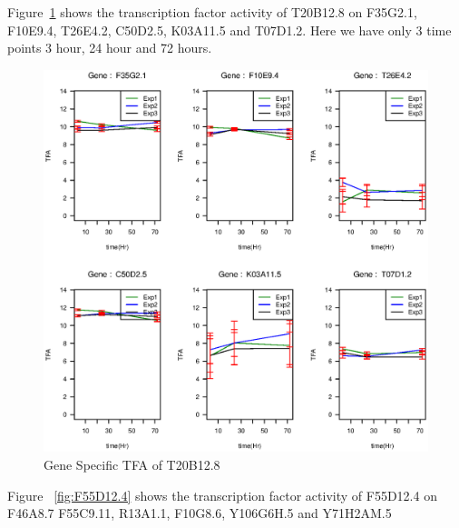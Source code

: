 \documentclass[a4paper,10pt]{report}
\begin{document}
Figure~\ref{fig:T20B12.8} shows the transcription factor activity of T20B12.8 on 
F35G2.1, F10E9.4, T26E4.2, C50D2.5, K03A11.5 and T07D1.2. Here we have only 3 time points
3 hour, 24 hour and 72 hours.  


\begin{figure}[!htb]
  \includegraphics[width=1.0\linewidth]{picture/T20B12_8_3dp_CE_YH_tfid19.eps}
  \caption{Gene Specific TFA of T20B12.8}
  \label{fig:T20B12.8}
\end{figure}

      
Figure ~\ref{fig:F55D12.4} shows the transcription factor activity of F55D12.4 on F46A8.7
F55C9.11, R13A1.1, F10G8.6, Y106G6H.5 and Y71H2AM.5
\end{document}
